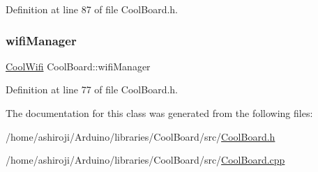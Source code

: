 Definition at line 87 of file Cool\+Board.\+h.

\mbox{\label{class_cool_board_acd88e6003606b47479ebba81e4aceeca}} 
\subsubsection{\texorpdfstring{wifi\+Manager}{wifiManager}}
{\footnotesize\ttfamily \hyperlink{class_cool_wifi}{Cool\+Wifi} Cool\+Board\+::wifi\+Manager\hspace{0.3cm}{\ttfamily [private]}}



Definition at line 77 of file Cool\+Board.\+h.



The documentation for this class was generated from the following files\+:\begin{DoxyCompactItemize}
\item 
/home/ashiroji/\+Arduino/libraries/\+Cool\+Board/src/\hyperlink{_cool_board_8h}{Cool\+Board.\+h}\item 
/home/ashiroji/\+Arduino/libraries/\+Cool\+Board/src/\hyperlink{_cool_board_8cpp}{Cool\+Board.\+cpp}\end{DoxyCompactItemize}
